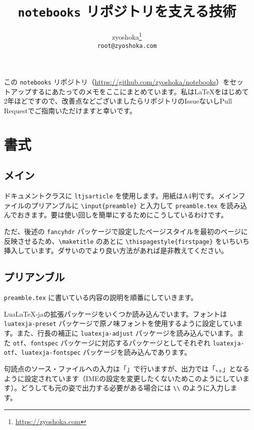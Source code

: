 \documentclass[a4paper]{ltjsarticle}
\begin{document}
\title{\texttt{notebooks} リポジトリを支える技術}
\author{zyoshoka\thanks{\url{https://zyoshoka.com}}\\\texttt{root@zyoshoka.com}}
\maketitle
\thispagestyle{firstpage}

この \texttt{notebooks} リポジトリ（\url{https://github.com/zyoshoka/notebooks}）をセットアップするにあたってのメモをここにまとめています。私は\LaTeX をはじめて2年ほどですので、改善点などございましたらリポジトリのIssueないしPull Requestでご指南いただけますと幸いです。

\section{書式}

\subsection{メイン}
ドキュメントクラスに \texttt{ltjsarticle} を使用します。用紙はA4判です。メインファイルのプリアンブルに \texttt{\textbackslash input\{preamble\}} と入力して \texttt{preamble.tex} を読み込んでおきます。要は使い回しを簡単にするためにこうしているわけです。

ただ、後述の \texttt{fancyhdr} パッケージで設定したページスタイルを最初のページに反映させるため、\texttt{\textbackslash maketitle} のあとに \texttt{\textbackslash thispagestyle\{firstpage\}} をいちいち挿入しています。ダサいのでより良い方法があれば是非教えてください。

\subsection{プリアンブル}
\texttt{preamble.tex} に書いている内容の説明を順番にしていきます。

Lua\LaTeX-jaの拡張パッケージをいくつか読み込んでいます。フォントは \texttt{luatexja-preset} パッケージで原ノ味フォントを使用するように設定しています。また、行長の補正に \texttt{luatexja-adjust} パッケージを読み込んでいます。また \texttt{otf}、\texttt{fontspec} パッケージに対応するパッケージとしてそれぞれ \texttt{luatexja-otf}、\texttt{luatexja-fontspec} パッケージを読み込んであります。

句読点のソース・ファイルへの入力は「\、\。」で行いますが、出力では「、。」となるように設定されています（IMEの設定を変更したくないためこのようにしています）。どうしても元の姿で出力する必要がある場合には \texttt{\textbackslash\、\textbackslash\。} のように入力します。
\end{document}
